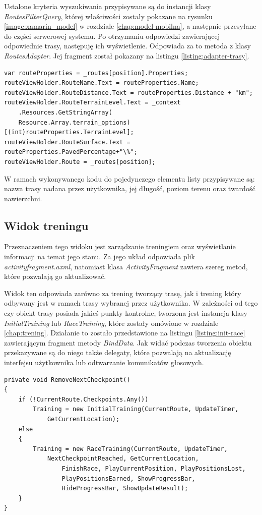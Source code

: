 Ustalone kryteria wyszukiwania przypisywane są do instancji klasy \textit{RoutesFilterQuery}, której właściwości zostały pokazane na rysunku \ref{image:xamarin_model} w rozdziale \ref{chap:model-mobilna}, a następnie przesyłane do części serwerowej systemu. Po otrzymaniu odpowiedzi zawierającej odpowiednie trasy, następuję ich wyświetlenie. Odpowiada za to metoda z klasy \textit{RoutesAdapter}. Jej fragment został pokazany na listingu \ref{listing:adapter-trasy}.
\begin{lstlisting}[caption={Przypisanie cech trasy do elementu listy},label=listing:adapter-trasy]
var routeProperties = _routes[position].Properties;
routeViewHolder.RouteName.Text = routeProperties.Name;
routeViewHolder.RouteDistance.Text = routeProperties.Distance + "km";
routeViewHolder.RouteTerrainLevel.Text = _context
	.Resources.GetStringArray(
	Resource.Array.terrain_options)[(int)routeProperties.TerrainLevel];
routeViewHolder.RouteSurface.Text = routeProperties.PavedPercentage+"\%";
routeViewHolder.Route = _routes[position];
\end{lstlisting}
W ramach wykonywanego kodu do pojedynczego elementu listy przypisywane są: nazwa trasy nadana przez użytkownika, jej długość, poziom terenu oraz twardość nawierzchni.

\subsection{Widok treningu}
Przeznaczeniem tego widoku jest zarządzanie treningiem oraz wyświetlanie informacji na temat jego stanu. Za jego układ odpowiada plik \textit{activity\textunderscore fragment.axml}, natomiast klasa \textit{ActivityFragment} zawiera szereg metod, które pozwalają go aktualizować.

Widok ten odpowiada zarówno za trening tworzący trasę, jak i trening który odbywany jest w ramach trasy wybranej przez użytkownika. W zależności od tego czy obiekt trasy posiada jakieś punkty kontrolne, tworzona jest instancja klasy \textit{InitialTraining} lub \textit{RaceTraining}, które zostały omówione w rozdziale \ref{chap:trening}. Działanie to zostało przedstawione na listingu \ref{listing:init-race} zawierającym fragment metody \textit{BindData}. Jak widać podczas tworzenia obiektu przekazywane są do niego także delegaty, które pozwalają na aktualizację interfejsu użytkownika lub odtwarzanie komunikatów głosowych.
\begin{lstlisting}[caption={Utworzenie obiektu zawierającego logikę treningu},label=listing:init-race]
private void RemoveNextCheckpoint()
{
	if (!CurrentRoute.Checkpoints.Any())
	    Training = new InitialTraining(CurrentRoute, UpdateTimer,
	    	GetCurrentLocation);
	else
	{
	    Training = new RaceTraining(CurrentRoute, UpdateTimer,
	    	NextCheckpointReached, GetCurrentLocation, 
      	    	FinishRace, PlayCurrentPosition, PlayPositionsLost,
      	    	PlayPositionsEarned, ShowProgressBar,
      	    	HideProgressBar, ShowUpdateResult);
	}
}
\end{lstlisting}
